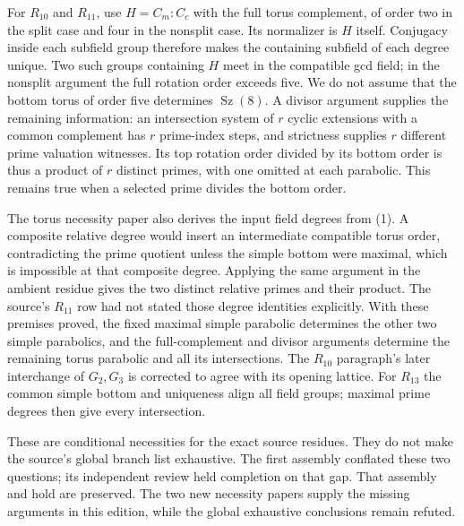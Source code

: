 \documentclass[11pt,a4paper]{article}
\newcommand{\Sz}{\operatorname{Sz}}
\begin{document}
For $R_{10}$ and $R_{11}$, use $H=C_m:C_c$ with the full torus
complement, of order two in the split case and four in the nonsplit
case. Its normalizer is $H$ itself. Conjugacy inside each subfield group
therefore makes the containing subfield of each degree unique. Two
such groups containing $H$ meet in the compatible gcd field; in the
nonsplit argument the full rotation order exceeds five. We do not
assume that the bottom torus of order five determines $\Sz(8)$.
A divisor argument supplies the remaining information: an intersection
system of $r$ cyclic extensions with a common complement has $r$
prime-index steps, and strictness supplies $r$ different prime valuation
witnesses. Its top rotation order divided by its bottom order is thus
a product of $r$ distinct primes, with one omitted at each parabolic.
This remains true when a selected prime divides the bottom order.

The torus necessity paper also derives the input field degrees from
(1). A composite relative degree would insert an intermediate compatible
torus order, contradicting the prime quotient unless the simple bottom
were maximal, which is impossible at that composite degree. Applying the
same argument in the ambient residue gives the two distinct relative
primes and their product. The source's $R_{11}$ row had not stated those
degree identities explicitly. With these premises proved, the fixed
maximal simple parabolic determines the other two simple parabolics,
and the full-complement and divisor arguments determine the remaining
torus parabolic and all its intersections. The $R_{10}$ paragraph's
later interchange of $G_2,G_3$ is corrected to agree with its opening
lattice. For $R_{13}$ the common simple bottom and uniqueness align all
field groups; maximal prime degrees then give every intersection.

These are conditional necessities for the exact source residues.
They do not make the source's global branch list exhaustive. The first
assembly conflated these two questions; its independent review held
completion on that gap. That assembly and hold are preserved. The two
new necessity papers supply the missing arguments in this edition,
while the global exhaustive conclusions remain refuted.
\end{document}
